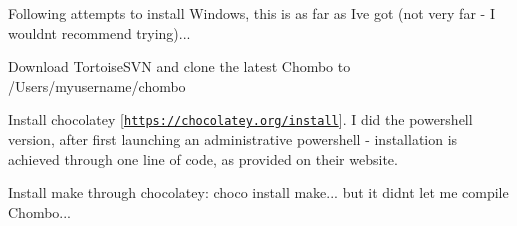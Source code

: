 Following attempts to install Windows, this is as far as I\textquotesingle{}ve got (not very far -\/ I wouldn\textquotesingle{}t recommend trying)...


\begin{DoxyEnumerate}
\item Download Tortoise\+S\+VN and clone the latest Chombo to /\+Users/myusername/chombo
\item Install chocolatey \mbox{[}\href{https://chocolatey.org/install}{\tt https\+://chocolatey.\+org/install}\mbox{]}. I did the powershell version, after first launching an administrative powershell -\/ installation is achieved through one line of code, as provided on their website.
\item Install {\ttfamily make} through chocolatey\+: {\ttfamily choco install make}... but it didn\textquotesingle{}t let me compile Chombo... 
\end{DoxyEnumerate}